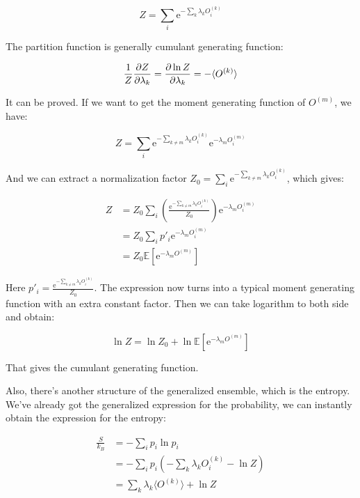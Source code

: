 \documentclass[../main.tex]{subfiles}
\begin{document}
\begin{equation}
    Z = \sum_{i} \textrm{e}^{-\sum_{k} \lambda_k O^{(k)}_i}
\end{equation}

The partition function is generally cumulant generating function:

\begin{equation}
    \frac{1}{Z}\pdv{Z}{\lambda_k} = \pdv{\ln Z}{\lambda_k} = -\langle O^{(k)} \rangle
\end{equation}

It can be proved. If we want to get the moment generating function of $O^{(m)}$, we have:

\begin{equation}
    Z = \sum_{i} \textrm{e}^{-\sum_{k \neq m} \lambda_k O^{(k)}_i}\textrm{e}^{-\lambda_m O_i^{(m)}}
\end{equation}

And we can extract a normalization factor $Z_0 = \sum_{i} \textrm{e}^{-\sum_{k \neq m} \lambda_k O^{(k)}_i}$, which gives:

\begin{align}
    Z &= Z_0 \sum_{i} (\frac{\textrm{e}^{-\sum_{k \neq m} \lambda_k O^{(k)}_i}}{Z_0})\textrm{e}^{-\lambda_m O_i^{(m)}}\nonumber\\
    &= Z_0 \sum_{i} p'_i \textrm{e}^{-\lambda_m O_i^{(m)}}\nonumber\\
    &= Z_0 \mathbb{E}[\textrm{e}^{-\lambda_m O^{(m)}}] 
\end{align}

Here $p'_i = \frac{\textrm{e}^{-\sum_{k \neq m} \lambda_k O^{(k)}_i}}{Z_0}$. The expression now turns into a typical moment generating function with an extra constant factor. Then we can take logarithm to both side and obtain:

\begin{equation}
    \ln Z = \ln Z_0 + \ln \mathbb{E}[\textrm{e}^{-\lambda_m O^{(m)}}] 
\end{equation}

That gives the cumulant generating function.

Also, there's another structure of the generalized ensemble, which is the entropy. We've already got the generalized expression for the probability, we can instantly obtain the expression for the entropy:

\begin{align}
    \frac{S}{k_B} &= -\sum_{i} p_i \ln p_i\nonumber\\
    &= -\sum_{i} p_i (-\sum_{k} \lambda_k O^{(k)}_i - \ln Z)\nonumber\\
    &= \sum_{k} \lambda_k \langle O^{(k)} \rangle + \ln Z
\end{align}
\end{document}
